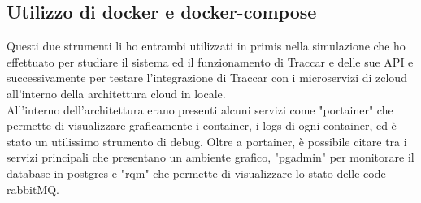 \documentclass[a4paper,titlepage,12pt]{book}
\begin{document}
\subsection{\sffamily
Utilizzo di docker e docker-compose}
Questi due strumenti li ho entrambi utilizzati in primis nella simulazione che ho effettuato per studiare il sistema ed il funzionamento di Traccar e delle sue API e successivamente per testare l'integrazione di Traccar con i microservizi di zcloud all'interno della architettura cloud in locale. \\
All'interno dell'architettura erano presenti alcuni servizi come "portainer" che permette di visualizzare graficamente i container, i logs di ogni container, ed è stato un utilissimo strumento di debug. Oltre a portainer, è possibile citare tra i servizi principali che presentano un ambiente grafico, "pgadmin" per monitorare il database in postgres e "rqm" che permette di visualizzare lo stato delle code rabbitMQ.

\sffamily
\end{document}
